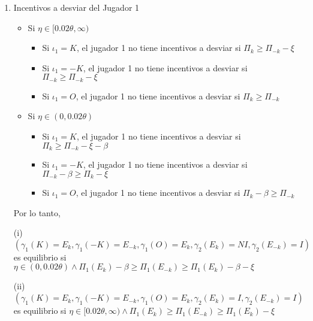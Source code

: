 {\begin{enumerate}
\begin{enumerate}
\begin{enumerate}
\begin{itemize}
            La mejor respuesta del jugador 2 (dado que $\eta>0$) si recibe un señal $E_{-k}$ es:
            \begin{equation*}
                \gamma_2(E_{-k})= I
            \end{equation*}
        \end{itemize}
        \end{enumerate}
        \item Incentivos a desviar del Jugador 1
        \begin{itemize}
        \item Si $\eta \in [0.02\theta,\infty) $
            \begin{itemize}
                \item Si $ \iota_1=K  $, el jugador 1 no tiene incentivos a desviar si $ \Pi_k \geq \Pi_{-k} - \xi $
                \item Si $ \iota_1=-K $, el jugador 1 no tiene incentivos a desviar si $ \Pi_{-k} \geq \Pi_{-k} - \xi $
                \item Si $ \iota_1=O  $, el jugador 1 no tiene incentivos a desviar si $ \Pi_k \geq \Pi_{-k} $
            \end{itemize}
        \item Si $\eta \in (0,0.02\theta) $
            \begin{itemize}
                \item Si $ \iota_1=K  $, el jugador 1 no tiene incentivos a desviar si $ \Pi_k \geq \Pi_{-k} - \xi - \beta $
                \item Si $ \iota_1=-K $, el jugador 1 no tiene incentivos a desviar si $ \Pi_{-k} -\beta \geq \Pi_{k} - \xi $
                \item Si $ \iota_1=O  $, el jugador 1 no tiene incentivos a desviar si $ \Pi_k - \beta \geq \Pi_{-k} $
            \end{itemize}
        \end{itemize}
    
    Por lo tanto, 

    \noindent (i) $(\gamma_1(K)=E_k, \gamma_1(-K)=E_{-k}, \gamma_1(O)=E_k, \gamma_2(E_k)=NI, \gamma_2(E_{-k})=I)$ es equilibrio si $\eta\in(0, 0.02\theta) \wedge \Pi_1(E_{k})- \beta \geq \Pi_1(E_{-k}) \geq  \Pi_1(E_{k})- \beta - \xi$

    \noindent (ii) $(\gamma_1(K)=E_k, \gamma_1(-K)=E_{-k}, \gamma_1(O)=E_k, \gamma_2(E_k)=I, \gamma_2(E_{-k})=I)$ es equilibrio si $\eta\in[0.02\theta, \infty) \wedge \Pi_1(E_{k}) \geq \Pi_1(E_{-k}) \geq \Pi_1(E_{k})- \xi$
    \end{enumerate}   


\end{enumerate}}
